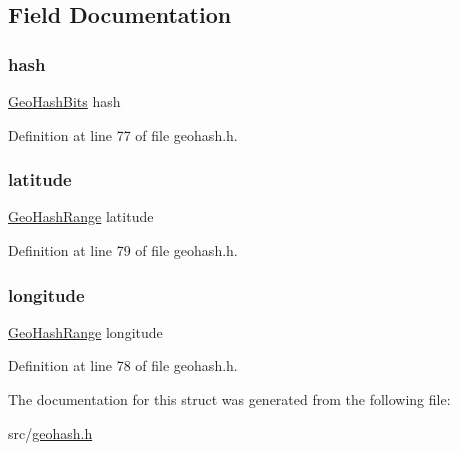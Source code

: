 \subsection{Field Documentation}
\mbox{\label{struct_geo_hash_area_aaa5dc202256f654179069f62d2d44cf6}} 
\subsubsection{\texorpdfstring{hash}{hash}}
{\footnotesize\ttfamily \hyperlink{struct_geo_hash_bits}{Geo\+Hash\+Bits} hash}



Definition at line 77 of file geohash.\+h.

\mbox{\label{struct_geo_hash_area_a131bc0a0b8951efaf43616802da61d34}} 
\subsubsection{\texorpdfstring{latitude}{latitude}}
{\footnotesize\ttfamily \hyperlink{struct_geo_hash_range}{Geo\+Hash\+Range} latitude}



Definition at line 79 of file geohash.\+h.

\mbox{\label{struct_geo_hash_area_ac9676284dd4031f83c6bf264b79267c6}} 
\subsubsection{\texorpdfstring{longitude}{longitude}}
{\footnotesize\ttfamily \hyperlink{struct_geo_hash_range}{Geo\+Hash\+Range} longitude}



Definition at line 78 of file geohash.\+h.



The documentation for this struct was generated from the following file\+:\begin{DoxyCompactItemize}
\item 
src/\hyperlink{geohash_8h}{geohash.\+h}\end{DoxyCompactItemize}
